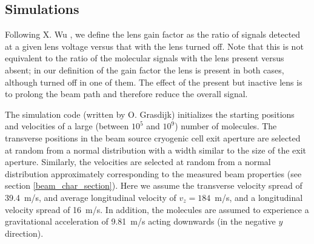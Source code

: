\subsection{Simulations}

Following X. Wu \cite{wu2022electrostatic}, we define the lens gain factor as
the ratio of signals detected at a given lens voltage versus that with the lens
turned off. Note that this is not equivalent to the ratio of the molecular
signals with the lens present versus absent; in our definition of the gain
factor the lens is present in both cases, although turned off in one of them.
The effect of the present but inactive lens is to prolong the beam path and
therefore reduce the overall signal.

The simulation code (written by O. Grasdijk) initializes the starting positions
and velocities of a large (between $10^5$ and $10^9$) number of molecules. The
transverse positions in the beam source cryogenic cell exit aperture are
selected at random from a normal distribution with a width similar to the size
of the exit aperture. Similarly, the velocities are selected at random from a
normal distribution approximately corresponding to the measured beam properties
(see section \ref{beam_char_section}). Here we assume the transverse velocity
spread of 39.4~m/s, and average longitudinal velocity of $v_z=184$~m/s, and a
longitudinal velocity spread of 16~m/s. In addition, the molecules are assumed
to experience a gravitational acceleration of 9.81~m/s acting downwards (in the
negative $y$ direction).


